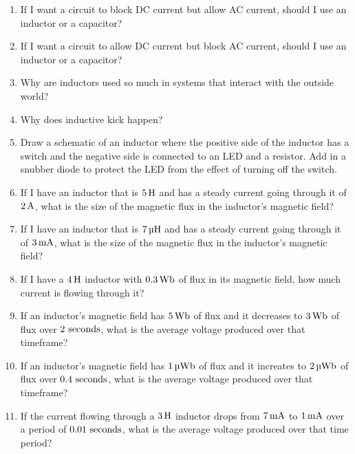 
\begin{enumerate}
\item If I want a circuit to block DC current but allow AC current, should I use an inductor or a capacitor?
\item If I want a circuit to allow DC current but block AC current, should I use an inductor or a capacitor?
\item Why are inductors used so much in systems that interact with the outside world?
\item Why does inductive kick happen?
\item Draw a schematic of an inductor where the positive side of the inductor has a switch and the negative side is connected to an LED and a resistor.  Add in a snubber diode to protect the LED from the effect of turning off the switch.
\item If I have an inductor that is $5\myhy$ and has a steady current going through it of $2\,\si{\ampere}$, what is the size of the magnetic flux in the inductor's magnetic field?
\item If I have an inductor that is $7\myuhy$ and has a steady current going through it of $3\,\si{\milli\ampere}$, what is the size of the magnetic flux in the inductor's magnetic field?
\item If I have a $4\myhy$ inductor with $0.3\mywb$ of flux in its magnetic field, how much current is flowing through it?
\item If an inductor's magnetic field has $5\mywb$ of flux and it decreases to $3\mywb$ of flux over $2\textrm{ seconds}$, what is the average voltage produced over that timeframe?
\item If an inductor's magnetic field has $1\myuwb$ of flux and it increates to $2\myuwb$ of flux over $0.4\textrm{ seconds}$, what is the average voltage produced over that timeframe?
\item If the current flowing through a $3\myhy$ inductor drops from $7\,\si{\milli\ampere}$ to $1\,\si{\milli\ampere}$ over a period of $0.01\textrm{ seconds}$, what is the average voltage produced over that time period?
\end{enumerate}
